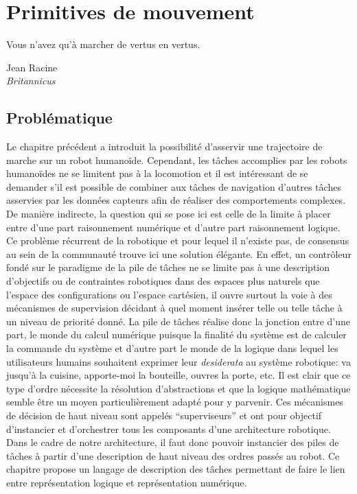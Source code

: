 \chapter{Primitives de mouvement}
\label{chap:primitive}

\epigraph{Vous n'avez qu'à marcher de vertus en vertus.}{Jean Racine\\\emph{Britannicus}}
\clearpage

\section{Problématique}

Le chapitre précédent a introduit la possibilité d'asservir une
trajectoire de marche sur un robot humanoïde. Cependant, les tâches
accomplies par les robots humanoïdes ne se limitent pas à la
locomotion et il est intéressant de se demander s'il est possible de
combiner aux tâches de navigation d'autres tâches asservies par les
données capteurs afin de réaliser des comportements complexes. De
manière indirecte, la question qui se pose ici est celle de la limite
à placer entre d'une part raisonnement numérique et d'autre part
raisonnement logique. Ce problème récurrent de la robotique et pour
lequel il n'existe pas, de consensus au sein de la communauté trouve
ici une solution élégante. En effet, un contrôleur fondé sur le
paradigme de la pile de tâches ne se limite pas à une description
d'objectifs ou de contraintes robotiques dans des espaces plus
naturels que l'espace des configurations ou l'espace cartésien, il
ouvre surtout la voie à des mécanismes de supervision décidant à quel
moment insérer telle ou telle tâche à un niveau de priorité donné. La
pile de tâches réalise donc la jonction entre d'une part, le monde du
calcul numérique puisque la finalité du système est de calculer la
commande du système et d'autre part le monde de la logique dans lequel
les utilisateurs humains souhaitent exprimer leur \emph{desiderata} au
système robotique: va jusqu'à la cuisine, apporte-moi la bouteille,
ouvres la porte, etc. Il est clair que ce type d'ordre nécessite la
résolution d'abstractions et que la logique mathématique semble être
un moyen particulièrement adapté pour y parvenir. Ces mécanismes de
décision de haut niveau sont appelés ``superviseurs'' et ont pour
objectif d'instancier et d'orchestrer tous les composants d'une
architecture robotique. Dans le cadre de notre architecture, il faut
donc pouvoir instancier des piles de tâches à partir d'une description
de haut niveau des ordres passés au robot. Ce chapitre propose un
langage de description des tâches permettant de faire le lien entre
représentation logique et représentation numérique.


